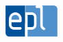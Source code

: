 \documentclass[a4paper, 12pt]{report}
\begin{document}
\begin{titlepage}




\begin{center}
  \includegraphics[width = 20mm]{img/epl} \hfill
\end{center}

\vfill %
\end{titlepage}
\end{document}
